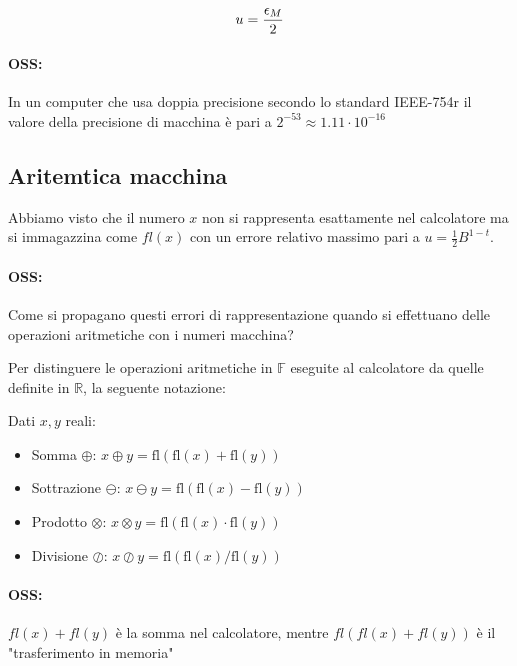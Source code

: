 \documentclass[a4paper, 11pt]{article}
\begin{document}
        \begin{align}
            u = \frac{\epsilon_M}{2} \notag
        \end{align}

        \paragraph{OSS:}
        In un computer che usa doppia precisione secondo lo standard IEEE-754r il valore della precisione di macchina è pari a $2^{-53} \approx 1.11 \cdot 10^{-16}$


        \subsection{Aritemtica macchina}

        Abbiamo visto che il numero $x$ non si rappresenta esattamente nel calcolatore ma si immagazzina come $fl(x)$ con un errore relativo massimo pari a
        $u = \frac{1}{2}B^{1-t}$.

        \paragraph{OSS: } 
        Come si propagano questi errori di rappresentazione quando si effettuano delle operazioni aritmetiche con i numeri macchina?

        Per distinguere le operazioni aritmetiche in $\mathbb{F}$ eseguite al calcolatore da quelle definite in $\mathbb{R}$, la seguente notazione:

        Dati \( x, y \) reali:

        \begin{itemize}
            \item Somma \( \oplus \):  $ x \oplus y = \text{fl}(\text{fl}(x) + \text{fl}(y))$ 


            \item Sottrazione \( \ominus \):  $ x \ominus y = \text{fl}(\text{fl}(x) - \text{fl}(y))$


            \item Prodotto \( \otimes \):  $ x \otimes y = \text{fl}(\text{fl}(x) \cdot \text{fl}(y)) $


            \item Divisione \( \oslash \):  $ x \oslash y = \text{fl}(\text{fl}(x) / \text{fl}(y)) $

        \end{itemize}

        \paragraph{OSS:} $fl(x)+fl(y)$ è la somma nel calcolatore, mentre $fl(fl(x)+fl(y))$ è il "trasferimento in memoria"
\end{document}
